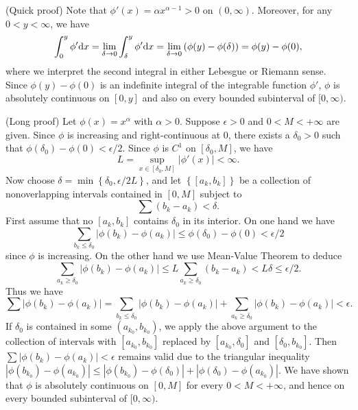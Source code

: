 \begin{exercise}{7.6}
(Quick proof)
Note that $\phi'(x) = \alpha x^{\alpha-1} > 0$ on $(0, \infty)$. 
Moreover, for any $0 < y < \infty$, 
we have
\[
  \int_0^y \phi' \mathrm{d} x
  = \lim_{\delta \rightarrow 0} \int_{\delta}^y \phi' \mathrm{d} x
  = \lim_{\delta \rightarrow 0} \left( \phi(y) - \phi(\delta) \right)
  = \phi(y) - \phi(0), 
\]
where we interpret the second integral 
in either Lebesgue or Riemann sense. 
Since $\phi(y) - \phi(0)$ is an indefinite integral of
the integrable function $\phi'$,
$\phi$ is absolutely continuous on $[0, y]$
and also on every bounded subinterval of $[0, \infty)$. 

(Long proof)
  Let $\phi(x) = x^{\alpha}$ with $\alpha > 0$.
  Suppose $\epsilon > 0$ and $0 < M < +\infty$ are given.
  Since $\phi$ is increasing and right-continuous at $0$,
  there exists a $\delta_0 > 0$ such that
  $\phi(\delta_0) - \phi(0) < \epsilon/2$.
  Since $\phi$ is $C^1$ on $[\delta_0, M]$,
  we have
  \[
    L = \sup_{x \in [\delta_0, M]} \left| \phi'(x) \right| < \infty.
  \]
  Now choose $\delta = \min \left\{ \delta_0, {\epsilon}/{2 L} \right\}$,
  and let $\left\{ [a_k, b_k] \right\}$ be a collection of
  nonoverlapping intervals contained in $[0, M]$ subject to
  \[
    \sum \left(b_k - a_k\right) < \delta.
  \]
  First assume that no $[a_k, b_k]$ contains $\delta_0$ in its interior.
  On one hand we have
  \[
    \sum_{b_k \le \delta_0} \left| \phi(b_k) - \phi(a_k) \right|
    \le \phi(\delta_0) - \phi(0) < \epsilon/2
  \]
  since $\phi$ is increasing.
  On the other hand we use Mean-Value Theorem to deduce
  \[
    \sum_{a_k \ge \delta_0} \vert \phi(b_k) - \phi(a_k) \vert
    \le L \sum_{a_k \ge \delta_0} \left( b_k - a_k \right)
    < L \delta \le \epsilon/2.
  \]
  Thus we have
  \[
    \sum \left| \phi(b_k) - \phi(a_k) \right|
    = \sum_{b_k \le \delta_0} \left| \phi(b_k) - \phi(a_k) \right|
    + \sum_{a_k \ge \delta_0} \left| \phi(b_k) - \phi(a_k) \right|
    < \epsilon.
  \]
  If $\delta_0$ is contained in some $(a_{k_0}, b_{k_0})$,
  we apply the above argument to the collection of intervals
  with $[a_{k_0}, b_{k_0}]$ replaced by
  $[a_{k_0}, \delta_0]$ and $[\delta_0, b_{k_0}]$.
  Then $\sum \left| \phi(b_k) - \phi(a_k) \right| < \epsilon$
  remains valid due to the triangular inequality
  $|\phi(b_{k_0}) - \phi(a_{k_0})| \le
  |\phi(b_{k_0}) - \phi(\delta_0)| + |\phi(\delta_0) - \phi(a_{k_0})|$.
  We have shown that $\phi$ is absolutely continuous on $[0, M]$
  for every $0 < M < +\infty$, 
  and hence on every bounded subinterval of $[0, \infty)$. 
\end{exercise}

